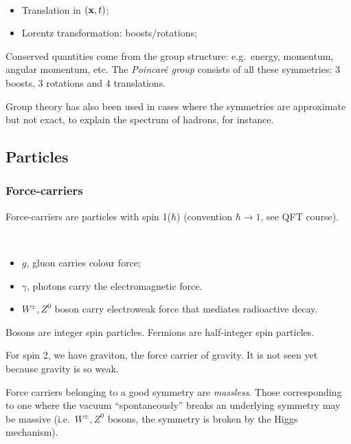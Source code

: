 \documentclass[a4paper,11pt]{article}
\begin{document}
	\begin{ex}
		\ 
		\begin{itemize}
			\item Translation in $(\vb x,t)$;
			\item Lorentz transformation: boosts/rotations;
		\end{itemize}
	\end{ex}

	Conserved quantities come from the group structure: e.g.\ energy, momentum, angular momentum, etc. The \emph{Poincar\'e group} consists of all these symmetries: 3 boosts, 3 rotations and 4 translations.

	Group theory has also been used in cases where the symmetries are approximate but not exact, to explain the spectrum of hadrons, for instance.

	\subsection{Particles}
	\subsubsection{Force-carriers} 
	
	Force-carriers are particles with spin 1($\hbar$) (convention $\hbar \to 1$, see QFT course).
	
	\begin{ex}
		\ 
		\begin{itemize}
			\item $g$, gluon carries colour force;
			\item $\gamma$, photons carry the electromagnetic force.
			\item $W^{\pm}, Z^0$ boson carry electroweak force that mediates radioactive decay.
		\end{itemize}
	\end{ex}

	\begin{nt}
		Bosons are integer spin particles. Fermions are half-integer spin particles.

		For spin 2, we have graviton, the force carrier of gravity. It is not seen yet because gravity is so weak.
	\end{nt}

	Force carriers belonging to a good symmetry are \emph{massless}. Those corresponding to one where the vacuum ``spontaneously'' breaks an underlying symmetry may be massive (i.e.\ $W^\pm, Z^0$ bosons, the symmetry is broken by the Higgs mechanism).
\end{document}
